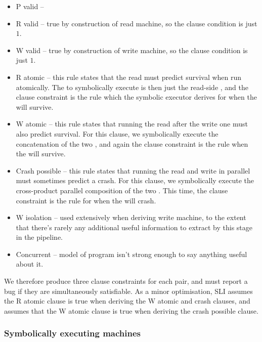 \begin{itemize}
\item P valid -- 
\item R valid -- true by construction of read machine, so the clause condition is just $1$.
\item W valid -- true by construction of write machine, so the clause condition is just $1$.
\item
  R atomic -- this rule states that the read \StateMachine must predict survival when run atomically.
  The \StateMachine to symbolically execute is then just the read-side \StateMachine, and the clause constraint is the rule which the symbolic executor derives for when the \StateMachine will survive.
\item
  W atomic -- this rule states that running the read \StateMachine after the write one must also predict survival.
  For this clause, we symbolically execute the concatenation of the two \StateMachines, and again the clause constraint is the rule when the \StateMachine will survive.
\item
  Crash possible -- this rule states that running the read and write \StateMachines in parallel must sometimes predict a crash.
  For this clause, we symbolically execute the cross-product parallel composition of the two \StateMachines.
  This time, the clause constraint is the rule for when the \StateMachine will crash.
\item
  W isolation -- used extensively when deriving write machine, to the extent that there's rarely any additional useful information to extract by this stage in the pipeline.
\item
  Concurrent -- model of program isn't strong enough to say anything useful about it.
\end{itemize}

We therefore produce three clause constraints for each \StateMachine pair, and must report a bug if they are simultaneously satisfiable.
As a minor optimisation, SLI assumes the R atomic clause is true when deriving the W atomic and crash clauses, and assumes that the W atomic clause is true when deriving the crash possible clause.

\subsubsection{Symbolically executing machines}

